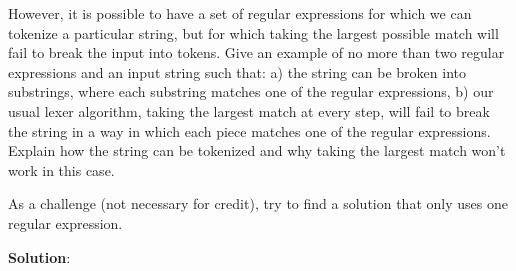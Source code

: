 \documentclass[11pt]{article}
\begin{document}
\begin{enumerate}
However, it is possible to have a set of regular expressions for which we can tokenize a particular string, but for which taking the largest possible match will fail to break the input into tokens. Give an example of no more than two regular expressions and an input string such that: a) the string can be broken into substrings, where each substring matches one of the regular expressions, b) our usual lexer algorithm, taking the largest match at every step, will fail to break the string in a way in which each piece matches one of the regular expressions. Explain how the string can be tokenized and why taking the largest match won't work in this case.

As a challenge (not necessary for credit), try to find a solution that only uses one regular expression.

\textbf{Solution}:

\end{enumerate}
\end{document}
